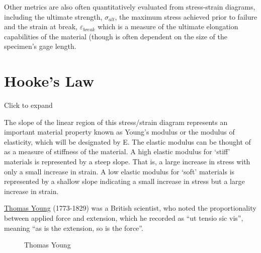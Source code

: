 \documentclass[
  letterpaper,
  DIV=11,
  numbers=noendperiod]{scrreprt}
\theoremstyle{definition}
\theoremstyle{remark}
\begin{document}
Other metrics are also often quantitatively evaluated from stress-strain
diagrams, including the ultimate strength, \(\sigma_{alt}\), the maximum
stress achieved prior to failure and the strain at break,
\(\varepsilon_{break}\) which is a measure of the ultimate elongation
capabilities of the material (though is often dependent on the size of
the specimen's gage length.

\section{Hooke's Law}\label{sec-4.3}

Click to expand

The slope of the linear region of this stress/strain diagram represents
an important material property known as Young's modulus or the modulus
of elasticity, which will be designated by E. The elastic modulus can be
thought of as a measure of stiffness of the material. A high elastic
modulus for `stiff' materials is represented by a steep slope. That is,
a large increase in stress with only a small increase in strain. A low
elastic modulus for `soft' materials is represented by a shallow slope
indicating a small increase in stress but a large increase in strain.

\href{https://en.wikipedia.org/wiki/Thomas_Young_(scientist)}{Thomas
Young} (1773-1829) was a British scientist, who noted the
proportionality between applied force and extension, which he recorded
as ``ut tensio sic vis'', meaning ``as is the extension, so is the
force''.

\begin{figure}


\caption{\label{fig-4.5}Thomas Young}

\end{figure}%
\end{document}
